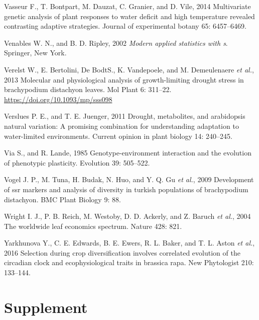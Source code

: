 \documentclass[jou,floatsintext]{apa6}
\begin{document}
\leavevmode\hypertarget{ref-vasseur2014multivariate}{}%
Vasseur F., T. Bontpart, M. Dauzat, C. Granier, and D. Vile, 2014 Multivariate genetic analysis of plant responses to water deficit and high temperature revealed contrasting adaptive strategies. Journal of experimental botany 65: 6457--6469.

\leavevmode\hypertarget{ref-MASS}{}%
Venables W. N., and B. D. Ripley, 2002 \emph{Modern applied statistics with s}. Springer, New York.

\leavevmode\hypertarget{ref-verelst2013molecular}{}%
Verelst W., E. Bertolini, De BodtS., K. Vandepoele, and M. Demeulenaere \emph{et al.}, 2013 Molecular and physiological analysis of growth-limiting drought stress in brachypodium distachyon leaves. Mol Plant 6: 311--22. \url{https://doi.org/10.1093/mp/sss098}

\leavevmode\hypertarget{ref-verslues2011drought}{}%
Verslues P. E., and T. E. Juenger, 2011 Drought, metabolites, and arabidopsis natural variation: A promising combination for understanding adaptation to water-limited environments. Current opinion in plant biology 14: 240--245.

\leavevmode\hypertarget{ref-via1985genotype}{}%
Via S., and R. Lande, 1985 Genotype-environment interaction and the evolution of phenotypic plasticity. Evolution 39: 505--522.

\leavevmode\hypertarget{ref-vogel2009development}{}%
Vogel J. P., M. Tuna, H. Budak, N. Huo, and Y. Q. Gu \emph{et al.}, 2009 Development of ssr markers and analysis of diversity in turkish populations of brachypodium distachyon. BMC Plant Biology 9: 88.

\leavevmode\hypertarget{ref-wright2004worldwide}{}%
Wright I. J., P. B. Reich, M. Westoby, D. D. Ackerly, and Z. Baruch \emph{et al.}, 2004 The worldwide leaf economics spectrum. Nature 428: 821.

\leavevmode\hypertarget{ref-yarkhunova2016selection}{}%
Yarkhunova Y., C. E. Edwards, B. E. Ewers, R. L. Baker, and T. L. Aston \emph{et al.}, 2016 Selection during crop diversification involves correlated evolution of the circadian clock and ecophysiological traits in brassica rapa. New Phytologist 210: 133--144.

\endgroup

\newpage
\setcounter{table}{0}  \renewcommand{\thetable}{S\arabic{table}} \setcounter{figure}{0} \renewcommand{\thefigure}{S\arabic{figure}}

\hypertarget{supplement}{%
\section{Supplement}\label{supplement}}
\end{document}
